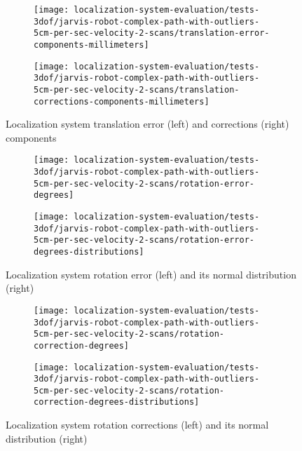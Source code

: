 \begin{figure}[ht]
	\centering
	\begin{subfigure}[h]{.497\textwidth}
		\centering
		\texttt{[image: localization-system-evaluation/tests-3dof/jarvis-robot-complex-path-with-outliers-5cm-per-sec-velocity-2-scans/translation-error-components-millimeters]}
	\end{subfigure}
	\begin{subfigure}[h]{.497\textwidth}
		\centering
		\texttt{[image: localization-system-evaluation/tests-3dof/jarvis-robot-complex-path-with-outliers-5cm-per-sec-velocity-2-scans/translation-corrections-components-millimeters]}
	\end{subfigure}
	\caption{Localization system translation error (left) and corrections (right) components}
	\label{fig:localization-system-evaluation_jarvis-robot-complex-path-with-outliers-5cm-per-sec-velocity-2-scans_translation-errors-components}
\end{figure}

\begin{figure}[ht]
	\centering
	\begin{subfigure}[h]{.497\textwidth}
		\centering
		\texttt{[image: localization-system-evaluation/tests-3dof/jarvis-robot-complex-path-with-outliers-5cm-per-sec-velocity-2-scans/rotation-error-degrees]}
	\end{subfigure}
	\begin{subfigure}[h]{.497\textwidth}
		\centering
		\texttt{[image: localization-system-evaluation/tests-3dof/jarvis-robot-complex-path-with-outliers-5cm-per-sec-velocity-2-scans/rotation-error-degrees-distributions]}
	\end{subfigure}
	\caption{Localization system rotation error (left) and its normal distribution (right)}
	\label{fig:localization-system-evaluation_jarvis-robot-complex-path-with-outliers-5cm-per-sec-velocity-2-scans_rotation-errors}
\end{figure}

\begin{figure}[ht]
	\centering
	\begin{subfigure}[h]{.497\textwidth}
		\centering
		\texttt{[image: localization-system-evaluation/tests-3dof/jarvis-robot-complex-path-with-outliers-5cm-per-sec-velocity-2-scans/rotation-correction-degrees]}
	\end{subfigure}
	\begin{subfigure}[h]{.497\textwidth}
		\centering
		\texttt{[image: localization-system-evaluation/tests-3dof/jarvis-robot-complex-path-with-outliers-5cm-per-sec-velocity-2-scans/rotation-correction-degrees-distributions]}
	\end{subfigure}
	\caption{Localization system rotation corrections (left) and its normal distribution (right)}
	\label{fig:localization-system-evaluation_jarvis-robot-complex-path-with-outliers-5cm-per-sec-velocity-2-scans_rotation-errors-corrections}
\end{figure}


